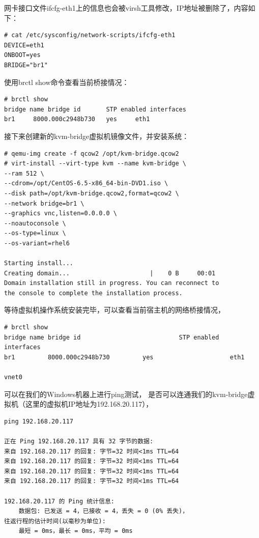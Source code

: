 网卡接口文件ifcfg-eth1上的信息也会被virsh工具修改，IP地址被删除了，内容如下：

\begin{verbatim}
# cat /etc/sysconfig/network-scripts/ifcfg-eth1
DEVICE=eth1
ONBOOT=yes
BRIDGE="br1"
\end{verbatim}

使用brctl show命令查看当前桥接情况：

\begin{verbatim}
# brctl show
bridge name	bridge id		STP enabled	interfaces
br1		8000.000c2948b730	yes		eth1
\end{verbatim}

接下来创建新的kvm-bridge虚拟机镜像文件，并安装系统：

\begin{verbatim}
# qemu-img create -f qcow2 /opt/kvm-bridge.qcow2
# virt-install --virt-type kvm --name kvm-bridge \
--ram 512 \
--cdrom=/opt/CentOS-6.5-x86_64-bin-DVD1.iso \
--disk path=/opt/kvm-bridge.qcow2,format=qcow2 \
--network bridge=br1 \
--graphics vnc,listen=0.0.0.0 \
--noautoconsole \
--os-type=linux \
--os-variant=rhel6

Starting install...
Creating domain...                      |    0 B     00:01     
Domain installation still in progress. You can reconnect to 
the console to complete the installation process.
\end{verbatim}

等待虚拟机操作系统安装完毕，可以查看当前宿主机的网络桥接情况，

\begin{verbatim}
# brctl show
bridge name	bridge id			                STP enabled		interfaces
br1			8000.000c2948b730		  yes		              eth1
														              vnet0
\end{verbatim}

可以在我们的Windows机器上进行ping测试，
是否可以连通我们的kvm-bridge虚拟机（这里的虚拟机IP地址为192.168.20.117），

\begin{verbatim}
ping 192.168.20.117

正在 Ping 192.168.20.117 具有 32 字节的数据:
来自 192.168.20.117 的回复: 字节=32 时间<1ms TTL=64
来自 192.168.20.117 的回复: 字节=32 时间<1ms TTL=64
来自 192.168.20.117 的回复: 字节=32 时间<1ms TTL=64
来自 192.168.20.117 的回复: 字节=32 时间<1ms TTL=64

192.168.20.117 的 Ping 统计信息:
    数据包: 已发送 = 4，已接收 = 4，丢失 = 0 (0% 丢失)，
往返行程的估计时间(以毫秒为单位):
    最短 = 0ms，最长 = 0ms，平均 = 0ms
\end{verbatim}

